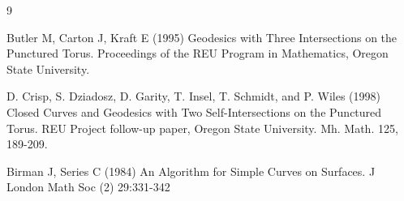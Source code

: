 \documentclass[11pt]{article}
\begin{document}
\begin{thebibliography}{9}

Butler M, Carton J, Kraft E (1995)
Geodesics with Three Intersections on the Punctured Torus.
Proceedings of the REU Program in Mathematics, Oregon
State University.

D. Crisp, S. Dziadosz, D. Garity, T. Insel, T. Schmidt, and P. Wiles (1998)
Closed Curves and Geodesics with Two Self-Intersections on the Punctured Torus.
REU Project follow-up paper, Oregon State University.
Mh. Math. 125, 189-209.

Birman J, Series C (1984)
An Algorithm for Simple Curves on Surfaces.
J London Math Soc (2) 29:331-342

\end{thebibliography}
\end{document}

